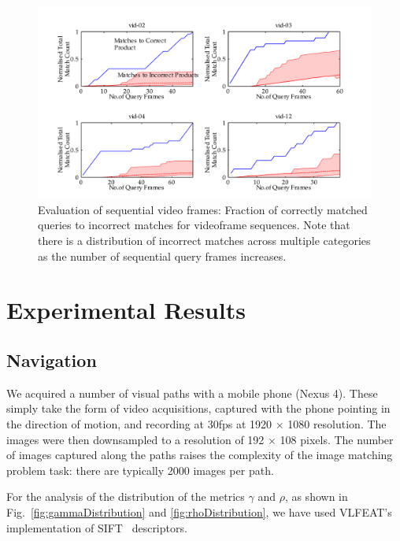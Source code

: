 \begin{figure}[t]
\centering
\includegraphics[width=\linewidth]{./gfx/Chapter02/prd0030shadedPlots-4-latex.pdf}
\caption{Evaluation of sequential video frames: Fraction of correctly matched queries to incorrect matches for videoframe sequences. Note that there is a distribution of incorrect matches across multiple categories as the number of sequential query frames increases.}        
\label{fig:prd003b}
\end{figure}


\section{Experimental Results} \label{sec:expResults}

\subsection{Navigation}

We acquired a number of visual paths with a mobile phone (Nexus 4).  These simply take the form of video acquisitions, captured with the phone pointing in the direction of motion, and recording at 30fps at 1920 $\times$ 1080 resolution. The images were then downsampled to a resolution of 192 $\times$ 108 pixels. The number of images captured along the paths raises the complexity of the image matching problem task: there are typically 2000 images per path.

For the analysis of the distribution of the metrics $\gamma$ and $\rho$, as shown in Fig.~\ref{fig:gammaDistribution} and \ref{fig:rhoDistribution}, we have used VLFEAT's~\cite{Vedaldi2008} implementation of SIFT~\cite{Lowe2004} descriptors.

